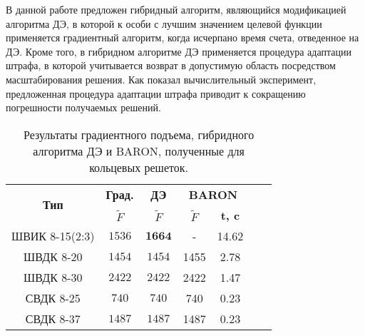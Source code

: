 В данной работе предложен гибридный алгоритм, являющийся  модификацией алгоритма ДЭ, в которой к особи с лучшим значением целевой функции применяется градиентный алгоритм, когда
исчерпано время счета, отведенное на ДЭ.
Кроме того, в гибридном алгоритме ДЭ применяется процедура адаптации штрафа, в которой учитывается возврат в допустимую область посредством масштабирования решения. Как показал вычислительный эксперимент, предложенная процедура адаптации штрафа приводит к сокращению погрешности получаемых решений.


\begin{table}[!h]

\centering
\caption{ Результаты градиентного подъема, гибридного алгоритма ДЭ и BARON, полученные для кольцевых решеток.}
\begin{tabular}{|c|c|c|cc|c c|}
    \hline
    \multirow{2}{*}{\textbf{Тип}} & \textbf{Град.} & \textbf{ДЭ} & \multicolumn{2}{|c|}{\textbf{BARON}} \\
    & \textbf{$\tilde{F}$} & \textbf{$\tilde{F}$} & \textbf{$\tilde{F}$} & \textbf{t, c}  \\
    \hline
    ШВИК 8-15(2:3) & ${1536}$  & $\mathbf{1664}$     & -   & 14.62     \\
    ШВДК 8-20      & ${1454}$  & ${1454}$  & 1455   & 2.78       \\
    ШВДК 8-30      & ${2422}$  & ${2422}$  & 2422   & 1.47     \\
    СВДК 8-25      & ${740}$  & ${740}$   & 740    & 0.23        \\
    СВДК 8-37      & ${1487}$  & ${1487}$  & 1487   & 0.23      \\
    \hline
\end{tabular}
\label{tab:results_de_2}
\end{table}

